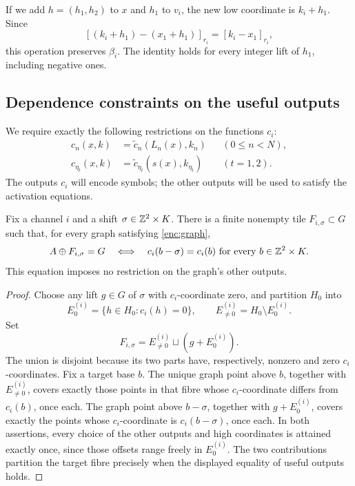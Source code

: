 If we add $h=(h_1,h_2)$ to $x$ and $h_1$ to $v_i$, the new low
coordinate is $k_i+h_1$.  Since
\[
 [(k_i+h_1)-(x_1+h_1)]_{r_i}=[k_i-x_1]_{r_i},
\]
this operation preserves $\beta_i$.  The identity holds for every
integer lift of $h_1$, including negative ones.

\subsection{Dependence constraints on the useful outputs}

We require exactly the following restrictions on the functions $c_i$:
\begin{equation}
 \begin{aligned}
 c_n(x,k)&=\widetilde c_n(L_n(x),k_n)
       &&(0\leq n<N),\\
 c_{\eta_t}(x,k)&=\widetilde c_{\eta_t}(s(x),k_{\eta_t})
       &&(t=1,2).
 \end{aligned}
 \label{enc:dependence}
\end{equation}
The outputs $c_i$ will encode symbols; the other outputs will be used
to satisfy the activation equations.

\begin{lemma}\label{enc:invariance}
Fix a channel $i$ and a shift $\sigma\in\mathbb Z^2\times K$.
There is a finite nonempty tile $F_{i,\sigma}\subset G$ such that,
for every graph satisfying \eqref{enc:graph},
\[
 A\oplus F_{i,\sigma}=G
 \quad\Longleftrightarrow\quad
 c_i(b-\sigma)=c_i(b)\text{ for every }b\in\mathbb Z^2\times K.
\]
This equation imposes no restriction on the graph's other outputs.
\end{lemma}

\begin{proof}
Choose any lift $g\in G$ of $\sigma$ with $c_i$-coordinate zero, and
partition $H_0$ into
\[
 E_0^{(i)}=\{h\in H_0:c_i(h)=0\},\qquad
 E_{\ne0}^{(i)}=H_0\setminus E_0^{(i)}.
\]
Set
\[
 F_{i,\sigma}=E_{\ne0}^{(i)}\sqcup(g+E_0^{(i)}).
\]
The union is disjoint because its two parts have, respectively,
nonzero and zero $c_i$-coordinates.  Fix a target base $b$.
The unique graph point above $b$, together with $E_{\ne0}^{(i)}$,
covers exactly those points in that fibre whose $c_i$-coordinate
differs from $c_i(b)$, once each.  The graph point above $b-\sigma$,
together with $g+E_0^{(i)}$, covers exactly the points whose
$c_i$-coordinate is $c_i(b-\sigma)$, once each.
In both assertions, every choice of the other outputs and high
coordinates is attained exactly once, since those offsets range
freely in $E_0^{(i)}$.  The two contributions partition the target
fibre precisely when the displayed equality of useful outputs holds.
\end{proof}

